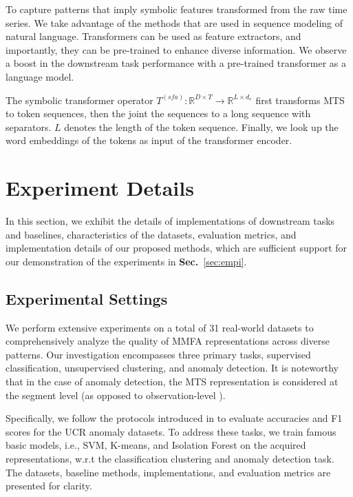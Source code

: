 \documentclass{article}
\begin{document}
To capture patterns that imply symbolic features transformed from the raw time series. We take advantage of the methods that are used in sequence modeling of natural language. Transformers can be used as feature extractors, and importantly, they can be pre-trained to enhance diverse information. We observe a boost in the downstream task performance with a pre-trained transformer as a language model. 

The symbolic transformer operator $T^{(sfa)}: \mathbb{R}^{D\times T} \to \mathbb{R}^{L \times d_e}$ first transforms MTS to token sequences, then the joint the sequences to a long sequence with separators. $L$ denotes the length of the token sequence. Finally, we look up the word embeddings of the tokens as input of the transformer encoder.



\section{Experiment Details}\label{sec:exp_detail}

In this section, we exhibit the details of implementations of downstream tasks and baselines, characteristics of the datasets, evaluation metrics, and implementation details of our proposed methods, which are sufficient support for our demonstration of the experiments in \textbf{Sec.}~\ref{sec:empi}. 


\subsection{Experimental Settings}
We perform extensive experiments on a total of 31 real-world datasets to comprehensively analyze the quality of MMFA representations across diverse patterns. Our investigation encompasses three primary tasks, supervised classification, unsupervised clustering, and anomaly detection. It is noteworthy that in the case of anomaly detection, the MTS representation is considered at the segment level (as opposed to observation-level \cite{li2021multivariate, su2019robust}). 

Specifically, we follow the protocols introduced in \cite{Wu2020CurrentTS} to evaluate accuracies and F1 scores for the UCR anomaly datasets. To address these tasks, we train famous basic models, i.e., SVM, K-means, and Isolation Forest on the acquired representations, w.r.t the classification clustering and anomaly detection task. The datasets, baseline methods, implementations, and evaluation metrics are presented for clarity.
\end{document}
